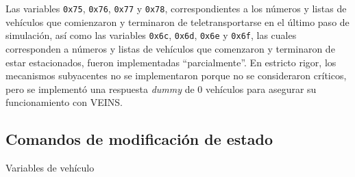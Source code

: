 \begin{description}[style=multiline]
    Las variables \texttt{0x75}, \texttt{0x76}, \texttt{0x77} y \texttt{0x78}, correspondientes a los números y listas de vehículos que comienzaron y terminaron de teletransportarse en el último paso de simulación, así como las variables \texttt{0x6c}, \texttt{0x6d}, \texttt{0x6e} y \texttt{0x6f}, las cuales corresponden a números y listas de vehículos que comenzaron y terminaron de estar estacionados, fueron implementadas ``parcialmente''. En estricto rigor, los mecanismos subyacentes no se implementaron porque no se consideraron críticos, pero se implementó una respuesta \emph{dummy} de 0 vehículos para asegurar su funcionamiento con VEINS.
    
\end{description}

\subsection{Comandos de modificación de estado}\label{sec:mod_state}

\begin{description}[style=multiline]
    \item [\texttt{0xc4}] Variables de vehículo
    \begin{multicols}{2}
        \begin{itemize}
            
        \end{itemize}
    \end{multicols}
\end{description}